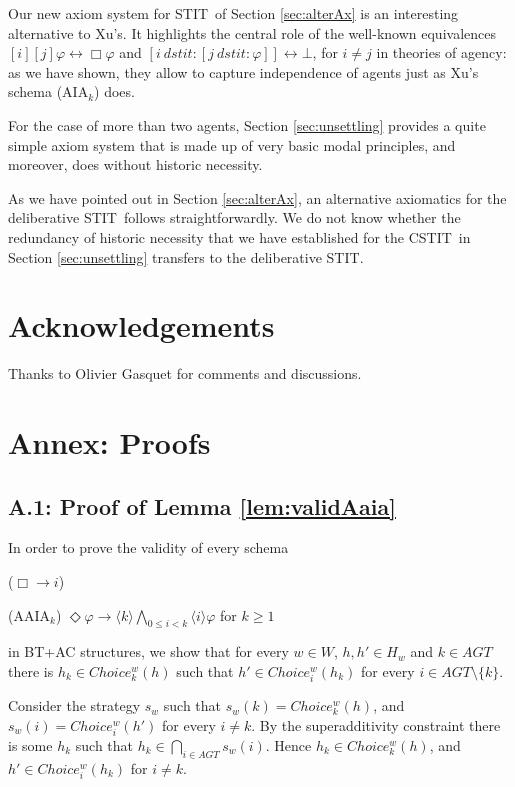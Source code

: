 \documentclass{article}
\renewcommand{\phi}{\varphi}
\newcommand{\eqv}{\leftrightarrow}      \newcommand{\imp}{\rightarrow}          \newcommand{\subfml}{\mathit{sf}}
\newcommand{\cstit}[1]{[{#1}]}           \newcommand{\poscstit}[1]{\langle {#1} \rangle}    \newcommand{\dstit}[2]{[{#1}\ \mathit{dstit}\! :{#2}]}
\newcommand{\InclBox}[1]{$\Box \!\! \imp \!\! #1$}
\newcommand{\agtset}{\ensuremath{\mathit{AGT}}}
\newcommand{\STIT} {{\textsf{STIT}}}              \newcommand{\CSTIT}{{\textsf{CSTIT}}}            \newcommand{\DSTIT}{{\textsf{DSTIT}}}
\begin{document}
Our new axiom system for \STIT\ of Section \ref{sec:alterAx}
is an interesting alternative to Xu's.
It highlights the central role of the well-known equivalences
$\cstit{i} \cstit{j}  \phi  \eqv \Box \phi $ and
$\dstit{i} {\dstit{j} \phi} \eqv \bot $, for $i \not = j$
in theories of agency:
as we have shown, they allow to capture independence of agents just as
Xu's schema (AIA$_k$) does.

For the case of more than two agents, Section \ref{sec:unsettling}
provides a quite simple axiom system that is made up of very basic
modal principles, and moreover, does without historic necessity.

As we have pointed out in Section \ref{sec:alterAx},
an alternative axiomatics for the deliberative \STIT\ follows
straightforwardly.
We do not know whether the redundancy of historic necessity that we have established
for the \CSTIT\ in Section \ref{sec:unsettling} transfers to the deliberative \STIT.

\section*{Acknowledgements}


Thanks to Olivier Gasquet for comments and discussions.





\section*{Annex: Proofs}


\subsection*{A.1: Proof of Lemma \ref{lem:validAaia}}

In order to prove the validity of every schema
\begin{itemlist}{(\InclBox{i})}
  \item[(AAIA$_k$)]
  $ \Diamond \phi \imp
    \poscstit{k} \bigwedge_{0 \leq i < k} \poscstit{i} \phi  $   \hfill for $k \geq 1$
\end{itemlist}
in BT+AC structures, we show that for every $w\in W$, $h,h' \in H_w$ and
$k \in \agtset$ there is $h_k \in Choice_k^w(h) $ such that
$h' \in Choice_i^w(h_k)$  for every $i \in \agtset \setminus \{k\}$.

Consider the strategy $s_w$ such that
$s_w(k) = Choice_k^w(h)$, and
$s_w(i) = Choice_i^w(h')$ for every $i \not = k$.
By the superadditivity constraint there is some $h_k$ such that
$h_k \in \bigcap_{i \in \agtset} s_w(i) $. Hence
$h_k \in Choice_k^w(h) $, and
$h'  \in Choice_i^w(h_k) $ for $i \not = k$.
\end{document}
